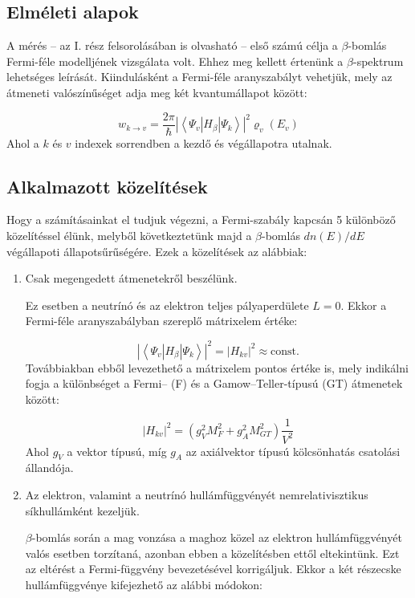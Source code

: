 \begin{multicols}{2}
\section{Elméleti alapok}
A mérés -- az I. rész felsorolásában is olvasható -- első számú célja a $\beta$-bomlás Fermi-féle modelljének vizsgálata volt. Ehhez meg kellett értenünk a $\beta$-spektrum lehetséges leírását. Kiindulásként a Fermi-féle aranyszabályt vehetjük, mely az átmeneti valószínűséget adja meg két kvantumállapot között:

\begin{equation} \label{eq:1}
w_{k \to v}
=
\frac{2 \pi}{\hbar} \left| \left< \Psi_{v} \left| H_{\beta} \right| \Psi_{k} \right> \right|^{2} \varrho_{v} \left( E_{v} \right)
\end{equation}
Ahol a $k$ és $v$ indexek sorrendben a kezdő és végállapotra utalnak.

\subsection{Alkalmazott közelítések}
Hogy a számításainkat el tudjuk végezni, a Fermi-szabály kapcsán 5 különböző közelítéssel élünk, melyből következtetünk majd a $\beta$-bomlás $dn\left( E \right) / dE$ végállapoti állapotsűrűségére. Ezek a közelítések az alábbiak:

\begin{enumerate}
\item Csak megengedett átmenetekről beszélünk. \par
Ez esetben a neutrínó és az elektron teljes pályaperdülete $L = 0$. Ekkor a Fermi-féle aranyszabályban szereplő mátrixelem értéke:

\begin{equation} \label{eq:2}
\left| \left< \Psi_{v} \left| H_{\beta} \right| \Psi_{k} \right> \right|^{2}
=
\left| H_{kv} \right|^{2}
\approx
\text{const.}
\end{equation}
Továbbiakban ebből levezethető a mátrixelem pontos értéke is, mely indikálni fogja a különbséget a Fermi-- (F) és a Gamow--Teller-típusú (GT) átmenetek között:

\begin{equation} \label{eq:3}
\left| H_{kv} \right|^{2}
=
\left( g_{V}^{2} M_{F}^{2} + g_{A}^{2} M_{GT}^{2} \right) \frac{1}{V^{2}}
\end{equation}
Ahol $g_{V}$ a vektor típusú, míg $g_{A}$ az axiálvektor típusú kölcsönhatás csatolási állandója.

\item Az elektron, valamint a neutrínó hullámfüggvényét nemrelativisztikus síkhullámként kezeljük. \par
$\beta$-bomlás során a mag vonzása a maghoz közel az elektron hullámfüggvényét valós esetben torzítaná, azonban ebben a közelítésben ettől eltekintünk. Ezt az eltérést a Fermi-függvény bevezetésével korrigáljuk. Ekkor a két részecske hullámfüggvénye kifejezhető az alábbi módokon:


\end{enumerate}
\end{multicols}

